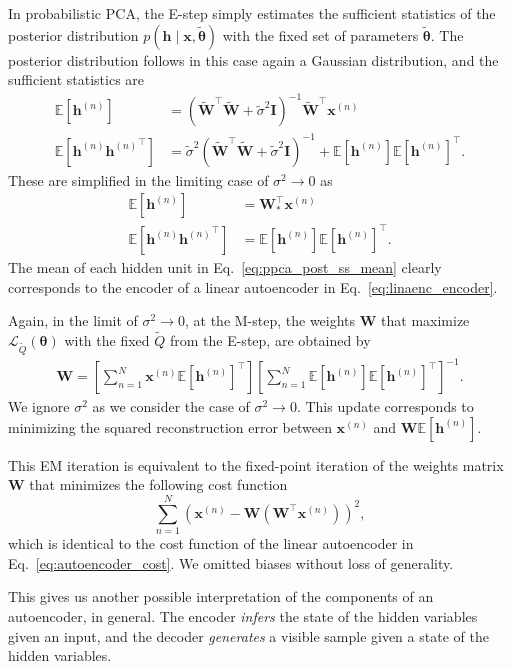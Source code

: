 \documentclass[dissertation,nocontribution,draft*]{aaltoseries}
\newcommand{\vect}[1]{\mathbf{#1}}
\newcommand{\vects}[1]{\boldsymbol{#1}}
\newcommand{\matr}[1]{\mathbf{#1}}
\newcommand{\vh}[0]{\vect{h}}
\newcommand{\vx}[0]{\vect{x}}
\newcommand{\mW}[0]{\matr{W}}
\newcommand{\mI}{\matr{I}}
\newcommand{\TT}[0]{{\vects{\theta}}}
\newcommand{\LL}[0]{\mathcal{L}}
\newcommand{\E}[0]{\mathbb{E}}
\begin{document}
In probabilistic PCA, the E-step simply estimates the
sufficient statistics of the posterior distribution $p(\vh
\mid \vx, \tilde{\TT})$ with the fixed set of parameters
$\tilde{\TT}$.
The posterior distribution follows in this case again a
Gaussian distribution, and the sufficient statistics are
\begin{align*}
    \E \left[ \vh^{(n)} \right] &= (\tilde{\mW}^\top
    \tilde{\mW} + \tilde{\sigma}^2
    \mI)^{-1} \tilde{\mW}^\top \vx^{(n)} \\
    \E \left[ \vh^{(n)} {\vh^{(n)}}^\top \right] &=
    \tilde{\sigma}^2 (\tilde{\mW}^\top \tilde{\mW} +
    \tilde{\sigma}^2
    \mI)^{-1} + \E\left[\vh^{(n)}\right] \E\left[ \vh^{(n)}
    \right]^\top.
\end{align*}
These are simplified in the limiting case of $\sigma^2 \to
0$ as
\begin{align}
    \label{eq:ppca_post_ss_mean}
    \E \left[ \vh^{(n)} \right] &= \mW_*^\top \vx^{(n)} \\
    \label{eq:ppca_post_ss_cov}
    \E \left[ \vh^{(n)} {\vh^{(n)}}^\top \right] &=
    \E\left[\vh^{(n)}\right] \E\left[ \vh^{(n)}
    \right]^\top.
\end{align}
The mean of each hidden unit in
Eq.~\eqref{eq:ppca_post_ss_mean} clearly corresponds to the
encoder of a linear autoencoder in
Eq.~\eqref{eq:linaenc_encoder}.

Again, in the limit of $\sigma^2 \to 0$, at the M-step, the
weights $\mW$ that maximize $\LL_{\tilde{Q}}(\TT)$ with the fixed
$\tilde{Q}$ from the E-step, are obtained by
\begin{align}
    \label{eq:ppca_m_weights}
    \mW = \left[ \sum_{n=1}^N \vx^{(n)} \E\left[ \vh^{(n)}
    \right]^\top \right]\left[ \sum_{n=1}^N \E\left[
    \vh^{(n)} \right] \E\left[ \vh^{(n)} \right]^\top
    \right]^{-1}.
\end{align}
We ignore $\sigma^2$ as we consider the case of $\sigma^2 \to
0$.  This update corresponds to minimizing the squared
reconstruction error between $\vx^{(n)}$ and $\mW
\E\left[\vh^{(n)}\right]$.

This EM iteration is equivalent to the fixed-point iteration
of the weights matrix $\mW$ that minimizes the following
cost function 
\[
\sum_{n=1}^N \left( \vx^{(n)} - \mW \left(\mW^\top
\vx^{(n)}\right)\right)^2,
\]
which is identical to the cost function of the linear
autoencoder in Eq.~\eqref{eq:autoencoder_cost}. We omitted
biases without loss of generality.

This gives us another possible interpretation of the
components of an autoencoder, in general. The encoder
\textit{infers} the state of the hidden variables given an
input, and the decoder \textit{generates} a visible sample
given a state of the hidden variables.
\end{document}
